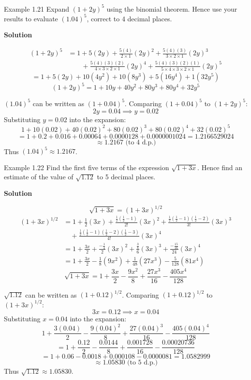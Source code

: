 \begin{example}{Example 1.21}
Expand $(1+2y)^5$ using the binomial theorem. Hence use your results to
evaluate $(1.04)^5$, correct to 4 decimal places.

\medskip\noindent\textbf{Solution}

\begin{align*}
  (1+2y)^5 &= 1 + 5(2y) + \frac{5(4)}{2\times1}(2y)^2 + \frac{5(4)(3)}{3\times2\times1}(2y)^3 \\
  &\qquad + \frac{5(4)(3)(2)}{4\times3\times2\times1}(2y)^4 + \frac{5(4)(3)(2)(1)}{5\times4\times3\times2\times1}(2y)^5
\end{align*}
\[
  = 1 + 5(2y) + 10(4y^2) + 10(8y^3) + 5(16y^4) + 1(32y^5)
\]
\[
  (1+2y)^5 = 1 + 10y + 40y^2 + 80y^3 + 80y^4 + 32y^5
\]

$(1.04)^5$ can be written as $(1+0.04)^5$. Comparing $(1+0.04)^5$ to $(1+2y)^5$:
\[
  2y = 0.04 \implies y = 0.02
\]
Substituting $y = 0.02$ into the expansion:
\[
  1 + 10(0.02) + 40(0.02)^2 + 80(0.02)^3 + 80(0.02)^4 + 32(0.02)^5
\]
\[
  = 1 + 0.2 + 0.016 + 0.00064 + 0.0000128 + 0.0000001024 = 1.2166529024
\]
\[
  \approx 1.2167 \text{ (to 4 d.p.)}
\]
Thus $(1.04)^5 \approx 1.2167$.
\end{example}

\begin{example}{Example 1.22}
Find the first five terms of the expression $\sqrt{1+3x}$. Hence find an estimate
of the value of $\sqrt{1.12}$ to 5 decimal places.

\medskip\noindent\textbf{Solution}

\[
  \sqrt{1+3x} = (1+3x)^{1/2}
\]
\begin{align*}
  (1+3x)^{1/2} &= 1 + \frac{1}{2}(3x) + \frac{\tfrac{1}{2}\left(\tfrac{1}{2}-1\right)}{2!}(3x)^2 + \frac{\tfrac{1}{2}\left(\tfrac{1}{2}-1\right)\left(\tfrac{1}{2}-2\right)}{3!}(3x)^3 \\
  &\quad + \frac{\tfrac{1}{2}\left(\tfrac{1}{2}-1\right)\left(\tfrac{1}{2}-2\right)\left(\tfrac{1}{2}-3\right)}{4!}(3x)^4 \\[4pt]
  &= 1 + \frac{3x}{2} + \frac{-\tfrac{1}{4}}{2}(3x)^2 + \frac{\tfrac{3}{8}}{6}(3x)^3 + \frac{-\tfrac{15}{16}}{24}(3x)^4 \\[4pt]
  &= 1 + \frac{3x}{2} - \frac{1}{8}(9x^2) + \frac{1}{48}(27x^3) - \frac{5}{128}(81x^4)
\end{align*}
\[
  \sqrt{1+3x} = 1 + \frac{3x}{2} - \frac{9x^2}{8} + \frac{27x^3}{16} - \frac{405x^4}{128}
\]

$\sqrt{1.12}$ can be written as $(1+0.12)^{1/2}$. Comparing $(1+0.12)^{1/2}$ to $(1+3x)^{1/2}$:
\[
  3x = 0.12 \implies x = 0.04
\]
Substituting $x = 0.04$ into the expansion:
\[
  1 + \frac{3(0.04)}{2} - \frac{9(0.04)^2}{8} + \frac{27(0.04)^3}{16} - \frac{405(0.04)^4}{128}
\]
\[
  = 1 + \frac{0.12}{2} - \frac{0.0144}{8} + \frac{0.001728}{16} - \frac{0.00020736}{128}
\]
\[
  = 1 + 0.06 - 0.0018 + 0.000108 - 0.0000081 = 1.0582999
\]
\[
  \approx 1.05830 \text{ (to 5 d.p.)}
\]
Thus $\sqrt{1.12} \approx 1.05830$.
\end{example}

